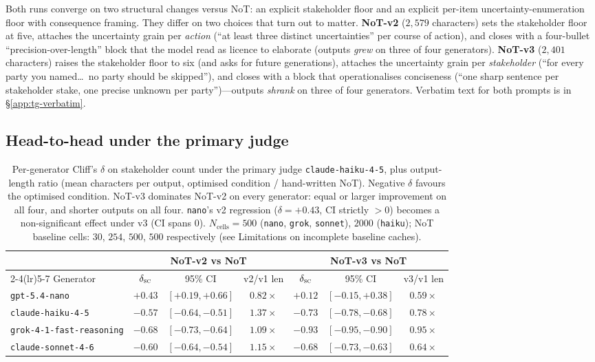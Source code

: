 \documentclass[11pt]{article}
\begin{document}
Both runs converge on two structural changes versus NoT: an explicit
stakeholder floor and an explicit per-item uncertainty-enumeration
floor with consequence framing. They differ on two choices that turn
out to matter. \textbf{NoT-v2} ($2{,}579$ characters) sets the
stakeholder floor at five, attaches the uncertainty grain per
\emph{action} (``at least three distinct uncertainties'' per course of
action), and closes with a four-bullet ``precision-over-length'' block
that the model read as licence to elaborate (outputs \emph{grew} on
three of four generators). \textbf{NoT-v3} ($2{,}401$ characters)
raises the stakeholder floor to six (and asks for future generations),
attaches the uncertainty grain per \emph{stakeholder} (``for every
party you named\ldots\ no party should be skipped''), and closes with a
block that operationalises conciseness (``one sharp sentence per
stakeholder stake, one precise unknown per party'')---outputs
\emph{shrank} on three of four generators. Verbatim text for both
prompts is in \S\ref{app:tg-verbatim}.

\subsection{Head-to-head under the primary judge}
\label{app:tg-head}

\begin{table}[t]
\centering\small
\begin{tabular}{lcccccc}
\toprule
& \multicolumn{3}{c}{\textbf{NoT-v2 vs NoT}} & \multicolumn{3}{c}{\textbf{NoT-v3 vs NoT}} \\
\cmidrule(lr){2-4}\cmidrule(lr){5-7}
Generator & $\delta_{\textsc{sc}}$ & 95\% CI & v2/v1 len & $\delta_{\textsc{sc}}$ & 95\% CI & v3/v1 len \\
\midrule
\texttt{gpt-5.4-nano}            & $+0.43$ & $[+0.19, +0.66]$ & $0.82\times$ & $+0.12$ & $[-0.15, +0.38]$ & $0.59\times$ \\
\texttt{claude-haiku-4-5}        & $-0.57$ & $[-0.64, -0.51]$ & $1.37\times$ & $-0.73$ & $[-0.78, -0.68]$ & $0.78\times$ \\
\texttt{grok-4-1-fast-reasoning} & $-0.68$ & $[-0.73, -0.64]$ & $1.09\times$ & $-0.93$ & $[-0.95, -0.90]$ & $0.95\times$ \\
\texttt{claude-sonnet-4-6}       & $-0.60$ & $[-0.64, -0.54]$ & $1.15\times$ & $-0.68$ & $[-0.73, -0.63]$ & $0.64\times$ \\
\bottomrule
\end{tabular}
\caption{Per-generator Cliff's $\delta$ on stakeholder count under the
primary judge \texttt{claude-haiku-4-5}, plus output-length ratio (mean
characters per output, optimised condition / hand-written NoT).
Negative $\delta$ favours the optimised condition. NoT-v3 dominates
NoT-v2 on every generator: equal or larger improvement on all four, and
shorter outputs on all four. \texttt{nano}'s v2 regression
($\delta = +0.43$, CI strictly $> 0$) becomes a non-significant effect
under v3 (CI spans $0$). $N_{\text{cells}} = 500$ (\texttt{nano},
\texttt{grok}, \texttt{sonnet}), $2000$ (\texttt{haiku}); NoT baseline
cells: $30$, $254$, $500$, $500$ respectively (see Limitations on
incomplete baseline caches).}
\label{tab:head_to_head}
\end{table}
\end{document}
